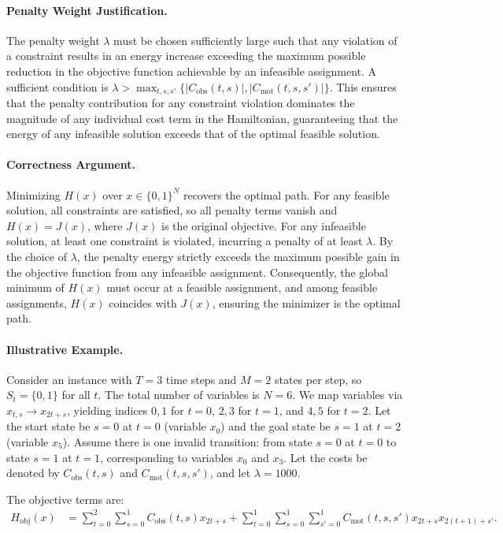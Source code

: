 \documentclass[12pt]{article}
\begin{document}
\paragraph{Penalty Weight Justification.}
The penalty weight $\lambda$ must be chosen sufficiently large such that any violation of a constraint results in an energy increase exceeding the maximum possible reduction in the objective function achievable by an infeasible assignment. A sufficient condition is $\lambda > \max_{t,s,s'} \{ |C_{\text{obs}}(t,s)|, |C_{\text{mot}}(t,s,s')| \}$. This ensures that the penalty contribution for any constraint violation dominates the magnitude of any individual cost term in the Hamiltonian, guaranteeing that the energy of any infeasible solution exceeds that of the optimal feasible solution.

\paragraph{Correctness Argument.}
Minimizing $H(x)$ over $x \in \{0,1\}^N$ recovers the optimal path. For any feasible solution, all constraints are satisfied, so all penalty terms vanish and $H(x) = J(x)$, where $J(x)$ is the original objective. For any infeasible solution, at least one constraint is violated, incurring a penalty of at least $\lambda$. By the choice of $\lambda$, the penalty energy strictly exceeds the maximum possible gain in the objective function from any infeasible assignment. Consequently, the global minimum of $H(x)$ must occur at a feasible assignment, and among feasible assignments, $H(x)$ coincides with $J(x)$, ensuring the minimizer is the optimal path.

\paragraph{Illustrative Example.}
Consider an instance with $T=3$ time steps and $M=2$ states per step, so $S_t = \{0, 1\}$ for all $t$. The total number of variables is $N=6$. We map variables via $x_{t,s} \to x_{2t+s}$, yielding indices $0,1$ for $t=0$, $2,3$ for $t=1$, and $4,5$ for $t=2$. Let the start state be $s=0$ at $t=0$ (variable $x_0$) and the goal state be $s=1$ at $t=2$ (variable $x_5$). Assume there is one invalid transition: from state $s=0$ at $t=0$ to state $s=1$ at $t=1$, corresponding to variables $x_0$ and $x_3$. Let the costs be denoted by $C_{\text{obs}}(t,s)$ and $C_{\text{mot}}(t,s,s')$, and let $\lambda = 1000$.

The objective terms are:
\begin{align}
H_{\text{obj}}(x) &= \sum_{t=0}^{2} \sum_{s=0}^{1} C_{\text{obs}}(t,s) x_{2t+s} + \sum_{t=0}^{1} \sum_{s=0}^{1} \sum_{s'=0}^{1} C_{\text{mot}}(t,s,s') x_{2t+s} x_{2(t+1)+s'}.
\end{align}
\end{document}
